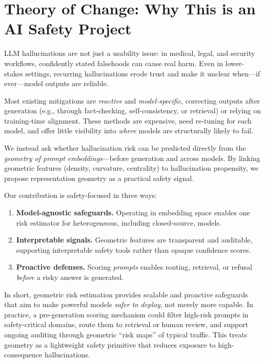 \documentclass{article}
\begin{document}
\section{Theory of Change: Why This is an AI Safety Project}
\label{sec:theory-of-change}

LLM hallucinations are not just a usability issue: in medical, legal, and security workflows, confidently stated falsehoods can cause real harm. Even in lower-stakes settings, recurring hallucinations erode trust and make it unclear when---if ever---model outputs are reliable.

Most existing mitigations are \emph{reactive} and \emph{model-specific}, correcting outputs after generation (e.g., through fact-checking, self-consistency, or retrieval) or relying on training-time alignment. These methods are expensive, need re-tuning for each model, and offer little visibility into \emph{where} models are structurally likely to fail.

We instead ask whether hallucination risk can be predicted directly from the \emph{geometry of prompt embeddings}---before generation and across models. By linking geometric features (density, curvature, centrality) to hallucination propensity, we propose representation geometry as a practical safety signal.

Our contribution is safety-focused in three ways:
\begin{enumerate}
    \item \textbf{Model-agnostic safeguards.} Operating in embedding space enables one risk estimator for heterogeneous, including closed-source, models.
    \item \textbf{Interpretable signals.} Geometric features are transparent and auditable, supporting interpretable safety tools rather than opaque confidence scores.
    \item \textbf{Proactive defenses.} Scoring \emph{prompts} enables routing, retrieval, or refusal \emph{before} a risky answer is generated.
\end{enumerate}

In short, geometric risk estimation provides scalable and proactive safeguards that aim to make powerful models \emph{safer to deploy}, not merely more capable. In practice, a pre-generation scoring mechanism could filter high-risk prompts in safety-critical domains, route them to retrieval or human review, and support ongoing auditing through geometric ``risk maps'' of typical traffic. This treats geometry as a lightweight safety primitive that reduces exposure to high-consequence hallucinations.
\end{document}
